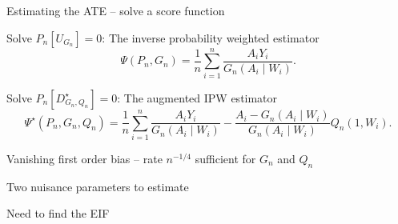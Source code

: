 \documentclass[smaller]{beamer}\usepackage{listings}
\begin{document}
\begin{frame}[label={sec:org3f8df9d}]{Estimating the ATE -- solve a score function}
\pause
\begin{block}{Solve \(P_n[U_{G_n}] = 0\): The inverse probability weighted estimator}
\begin{equation*}
  \Psi(P_n, G_n) = \frac{1}{n}\sum_{i=1}^{n}\frac{A_iY_i}{G_n(A_i \mid W_i)}.
\end{equation*}
\pause
\end{block}
\begin{block}{Solve \(P_n[D^{\star}_{G_n, Q_n}] = 0\): The augmented IPW estimator}
\begin{equation*}
  \Psi^{\star}(P_n, G_n, Q_n) = \frac{1}{n}\sum_{i=1}^{n}\frac{A_iY_i}{G_n(A_i \mid W_i)} -
  \frac{A_i - G_n(A_i \mid W_i)}{G_n(A_i \mid W_i)}Q_n(1, W_i).
\end{equation*}

\hfill

\pause
\begin{description}[\leftmargin=1em]
\item[{\color{green}\(\checkmark\)}] Vanishing first order bias -- rate \(n^{-1/4}\) sufficient for \(G_n\)
and \(Q_n\) \pause
\item[{\color{red}\(\times\)}] Two nuisance parameters to estimate \pause
\item[{\color{red}\(\times\)}] Need to find the EIF
\end{description}
\end{block}
\end{frame}
\end{document}
